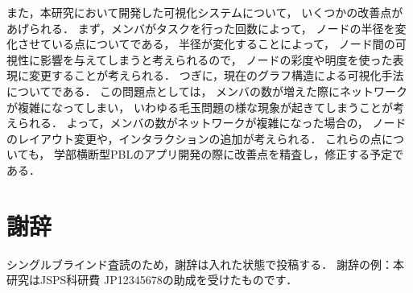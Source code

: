 \documentclass[twoside]{wiss}
\begin{document}
また，本研究において開発した可視化システムについて，
いくつかの改善点があげられる．
まず，メンバがタスクを行った回数によって，
ノードの半径を変化させている点についてである，
半径が変化することによって，
ノード間の可視性に影響を与えてしまうと考えられるので，
ノードの彩度や明度を使った表現に変更することが考えられる．
つぎに，現在のグラフ構造による可視化手法についてである．
この問題点としては，
メンバの数が増えた際にネットワークが複雑になってしまい，
いわゆる毛玉問題の様な現象が起きてしまうことが考えられる．
よって，メンバの数がネットワークが複雑になった場合の，
ノードのレイアウト変更や，インタラクションの追加が考えられる．
これらの点についても，
学部横断型PBLのアプリ開発の際に改善点を精査し，修正する予定である．

\vspace{100mm}

\section*{謝辞}
シングルブラインド査読のため，謝辞は入れた状態で投稿する．
謝辞の例：本研究はJSPS科研費 JP12345678の助成を受けたものです．



\balance %



\end{document}
